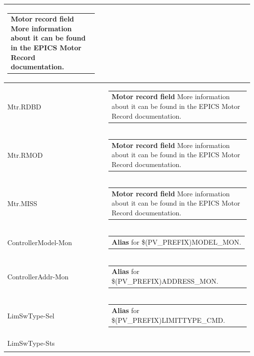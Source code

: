 \documentclass[openany]{article}
\begin{document}
\begin{longtable}{| m{4.5cm} m{2.5cm}  m{8.5cm} |}
\begin{tabular}{@{}m{6cm}@{}}
                \textbf{\color{ForestGreen} Motor record field} More information about it can be found in the EPICS Motor Record documentation.
            \end{tabular} \hypertarget{pv:mtr-rdbd}{}\\ \hline
        Mtr.RDBD &  & \begin{tabular}{@{}m{6cm}@{}}
                \textbf{\color{ForestGreen} Motor record field} More information about it can be found in the EPICS Motor Record documentation.
            \end{tabular} \hypertarget{pv:mtr-rmod}{}\\ \hline
        Mtr.RMOD &  & \begin{tabular}{@{}m{6cm}@{}}
                \textbf{\color{ForestGreen} Motor record field} More information about it can be found in the EPICS Motor Record documentation.
            \end{tabular} \hypertarget{pv:mtr-miss}{}\\ \hline
        Mtr.MISS &  & \begin{tabular}{@{}m{6cm}@{}}
                \textbf{\color{ForestGreen} Motor record field} More information about it can be found in the EPICS Motor Record documentation.
            \end{tabular} \hypertarget{pv:controller-model-mon}{}\\ \hline
        ControllerModel-Mon &  & \begin{tabular}{@{}m{6cm}@{}}
                \textbf{\color{blue} Alias} for \$(PV\_PREFIX)MODEL\_MON.
            \end{tabular} \hypertarget{pv:controller-addr-mon}{}\\ \hline
        ControllerAddr-Mon &  & \begin{tabular}{@{}m{6cm}@{}}
                \textbf{\color{blue} Alias} for \$(PV\_PREFIX)ADDRESS\_MON.
            \end{tabular} \hypertarget{pv:lim-sw-type}{}\\ \hline
        LimSwType-Sel &  & \begin{tabular}{@{}m{6cm}@{}}
                \textbf{\color{blue} Alias} for \$(PV\_PREFIX)LIMITTYPE\_CMD.
            \end{tabular} \hypertarget{}{}\\ \hline
        LimSwType-Sts &  & \begin{tabular}{@{}m{6cm}@{}}

\end{tabular}
\end{longtable}
\end{document}

